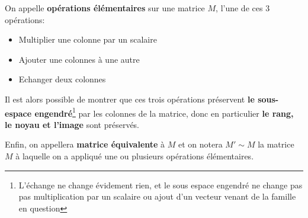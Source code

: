 On appelle \textbf{opérations élémentaires} sur une matrice \(M\), l'une de ces 3 opérations:
\begin{itemize}
   \item Multiplier une colonne par un scalaire
   \item Ajouter une colonnes à une autre
   \item Echanger deux colonnes
\end{itemize}
Il est alors possible de montrer que ces trois opérations préservent \textbf{le sous-espace engendré}\footnote[3]{L'échange ne change évidement rien, et le sous espace engendré ne change pas pas multiplication par un scalaire ou ajout d'un vecteur venant de la famille en question} par les colonnes de la matrice, donc en particulier \textbf{le rang, le noyau et l'image} sont préservés.\<

Enfin, on appellera \textbf{matrice équivalente} à \(M\) et on notera \(M' \sim M\) la matrice \(M\) à laquelle on a appliqué une ou plusieurs opérations élémentaires.
\pagebreak

